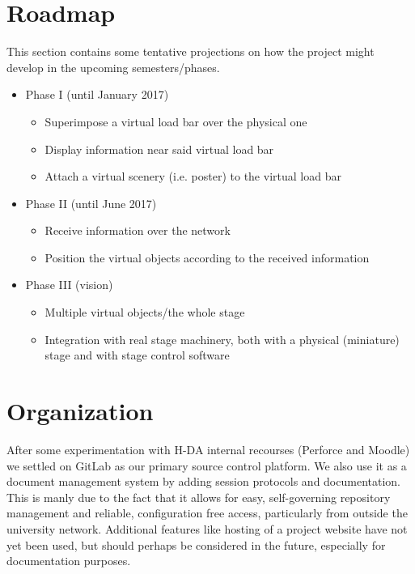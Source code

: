 \section{Roadmap}
This section contains some tentative projections on how the project might develop in the upcoming semesters/phases. 
\begin{itemize}
\item Phase I (until January 2017)
	\begin{itemize}
    \item Superimpose a virtual load bar over the physical one
    \item Display information near said virtual load bar  
    \item Attach a virtual scenery (i.e. poster) to the virtual load bar  
    \end{itemize}
\item Phase II (until June 2017)
	\begin{itemize}
    \item Receive information over the network  
    \item Position the virtual objects according to the received information   
    \end{itemize}
\item Phase III (vision)
	\begin{itemize}
    \item Multiple virtual objects/the whole stage 
    \item Integration with real stage machinery, both with a physical (miniature) stage and with stage control software
    \end{itemize}
\end{itemize}


\section{Organization}
After some experimentation with H-DA internal recourses (Perforce and Moodle) we settled on GitLab as our primary source control platform. We also use it as a document management system by adding session protocols and documentation. This is manly due to the fact that it allows for easy, self-governing repository management  and reliable, configuration free access, particularly from outside the university network. Additional features like hosting of a project website have not yet been used, but should perhaps be considered in the future, especially for documentation purposes.
